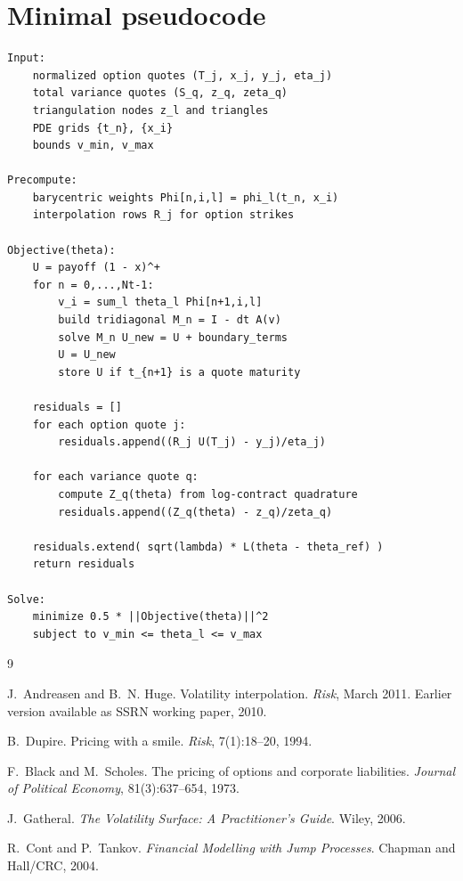 \documentclass[11pt]{article}
\newcommand{\1}{\mathbf{1}}
\begin{document}
\section{Minimal pseudocode}

\begin{verbatim}
Input:
    normalized option quotes (T_j, x_j, y_j, eta_j)
    total variance quotes (S_q, z_q, zeta_q)
    triangulation nodes z_l and triangles
    PDE grids {t_n}, {x_i}
    bounds v_min, v_max

Precompute:
    barycentric weights Phi[n,i,l] = phi_l(t_n, x_i)
    interpolation rows R_j for option strikes

Objective(theta):
    U = payoff (1 - x)^+
    for n = 0,...,Nt-1:
        v_i = sum_l theta_l Phi[n+1,i,l]
        build tridiagonal M_n = I - dt A(v)
        solve M_n U_new = U + boundary_terms
        U = U_new
        store U if t_{n+1} is a quote maturity

    residuals = []
    for each option quote j:
        residuals.append((R_j U(T_j) - y_j)/eta_j)

    for each variance quote q:
        compute Z_q(theta) from log-contract quadrature
        residuals.append((Z_q(theta) - z_q)/zeta_q)

    residuals.extend( sqrt(lambda) * L(theta - theta_ref) )
    return residuals

Solve:
    minimize 0.5 * ||Objective(theta)||^2
    subject to v_min <= theta_l <= v_max
\end{verbatim}

\begin{thebibliography}{9}

J.~Andreasen and B.~N. Huge.
\newblock Volatility interpolation.
\newblock \emph{Risk}, March 2011. Earlier version available as SSRN working
paper, 2010.

B.~Dupire.
\newblock Pricing with a smile.
\newblock \emph{Risk}, 7(1):18--20, 1994.

F.~Black and M.~Scholes.
\newblock The pricing of options and corporate liabilities.
\newblock \emph{Journal of Political Economy}, 81(3):637--654, 1973.

J.~Gatheral.
\newblock \emph{The Volatility Surface: A Practitioner's Guide}.
\newblock Wiley, 2006.

R.~Cont and P.~Tankov.
\newblock \emph{Financial Modelling with Jump Processes}.
\newblock Chapman and Hall/CRC, 2004.

\end{thebibliography}
\end{document}
